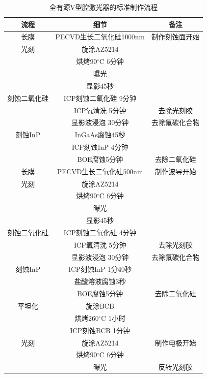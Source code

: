 \documentclass{ZJUthesis}
\begin{document}
\begin{table}[htbp]
    \caption{全有源V型腔激光器的标准制作流程}
    \centering
    \label{vccl_fab}
    \begin{tabular}{ccc}
        \hline
        \hline
        流程 & 细节 & 备注\\
        \hline
        长膜 &PECVD生长二氧化硅1000nm &制作刻蚀面开始\\
        \hline
        光刻 &旋涂AZ5214 &\\
            &烘烤90$^{\circ}$C 6分钟 &\\
            &曝光 &\\
            &显影45秒 &\\
        \hline
        刻蚀二氧化硅 &ICP刻蚀二氧化硅 9分钟 &\\
            &ICP氧清洗 5分钟 & 去除光刻胶\\
            &显影液浸泡 30分钟 &去除氟碳化合物\\
        \hline
        刻蚀InP &InGaAs腐蚀45秒 \\
            &ICP刻蚀InP 4分钟 &\\
            &BOE腐蚀5分钟 &去除二氧化硅\\
        \hline
        长膜 &PECVD生长二氧化硅500nm &制作波导开始\\
        \hline
        光刻 &旋涂AZ5214 &\\
            &烘烤90$^{\circ}$C 6分钟 &\\
            &曝光 &\\
            &显影45秒 &\\
        \hline
        刻蚀二氧化硅 &ICP刻蚀二氧化硅 4分钟 &\\
            &ICP氧清洗 5分钟 & 去除光刻胶\\
            &显影液浸泡 30分钟 &去除氟碳化合物\\
        \hline
        刻蚀InP &ICP刻蚀InP 1分40秒 &\\
            &盐酸溶液腐蚀3秒 &\\
            &BOE腐蚀5分钟 &去除二氧化硅\\
        \hline
        平坦化 &旋涂BCB &\\
            &烘烤260$^{\circ}$C 1小时 &\\
            &ICP刻蚀BCB 1分钟 &\\
        \hline
        光刻 &旋涂AZ5214 &制作电极开始\\
            &烘烤90$^{\circ}$C 6分钟 &\\
            &曝光 & 反转光刻胶\\

\end{tabular}
\end{table}
\end{document}
